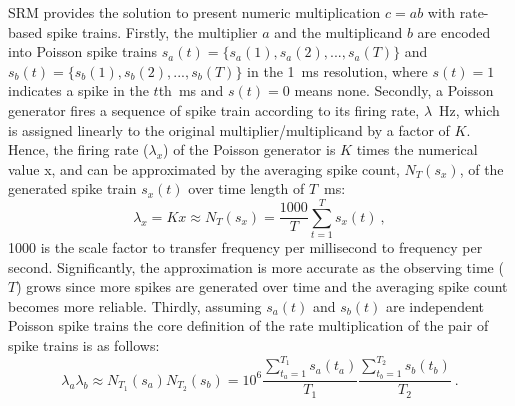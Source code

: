 SRM provides the solution to present numeric multiplication $c=ab$ with rate-based spike trains.
Firstly, the multiplier $a$ and the multiplicand $b$ are encoded into Poisson spike trains $s_a(t)=\{s_a(1),s_a(2),...,s_a(T)\}$ and $s_b(t)=\{s_b(1),s_b(2),...,s_b(T)\}$ in the 1~ms resolution, where $s(t)=1$ indicates a spike in the $t$th~ms and $s(t)=0$ means none.
Secondly, a Poisson generator fires a sequence of spike train according to its firing rate, $\lambda$~Hz, which is assigned linearly to the original multiplier/multiplicand by a factor of $K$.
Hence, the firing rate ($\lambda_x$) of the Poisson generator is $K$ times the numerical value x, and can be approximated by the averaging spike count, $N_T(s_x)$, of the generated spike train $s_x(t)$ over time length of $T$~ms:
\begin{equation}
\lambda_x = Kx \approx N_T(s_x) = \frac{1000}{T} \sum_{t=1}^{T} s_x(t)~,
\end{equation} 
1000 is the scale factor to transfer frequency per millisecond to frequency per second.
Significantly, the approximation is more accurate as the observing time ($T$) grows since more spikes are generated over time and the averaging spike count becomes more reliable.
Thirdly, assuming $s_a(t)$ and $s_b(t)$ are independent Poisson spike trains the core definition of the rate multiplication of the pair of spike trains is as follows:
\begin{equation}
\lambda_a \lambda_b \approx N_{T_1}(s_a)N_{T_2}(s_b)= 10^6 \frac{\sum_{t_a=1}^{T_1}s_a(t_a)}{T_1}  \frac{\sum_{t_b=1}^{T_2} s_b(t_b)}{T_2}~.
\label{equ:mul}
\end{equation} 

